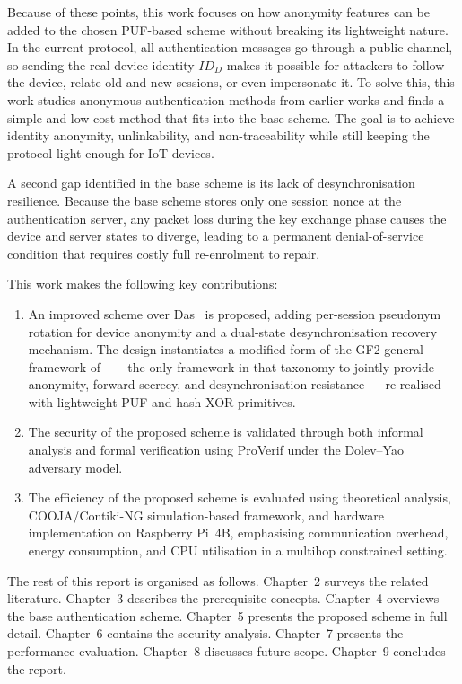 \documentclass[12pt,a4paper]{report}
\begin{document}
Because of these points, this work focuses on how anonymity features can be added to
the chosen PUF-based scheme without breaking its lightweight nature.
In the current protocol, all authentication messages go through a public channel, so
sending the real device identity $ID_D$ makes it possible for attackers to follow the
device, relate old and new sessions, or even impersonate it.
To solve this, this work studies anonymous authentication methods from earlier works
and finds a simple and low-cost method that fits into the base scheme.
The goal is to achieve identity anonymity, unlinkability, and non-traceability while
still keeping the protocol light enough for IoT devices.

A second gap identified in the base scheme is its lack of desynchronisation
resilience.
Because the base scheme stores only one session nonce at the authentication server,
any packet loss during the key exchange phase causes the device and server states to
diverge, leading to a permanent denial-of-service condition that requires costly
full re-enrolment to repair.

This work makes the following key contributions:
\begin{enumerate}
  \item An improved scheme over Das~\cite{das2026comsnets} is proposed, adding
    per-session pseudonym rotation for device anonymity and a dual-state
    desynchronisation recovery mechanism. The design instantiates a modified form
    of the GF2 general framework of~\cite{zhong2025survey} — the only framework in
    that taxonomy to jointly provide anonymity, forward secrecy, and
    desynchronisation resistance — re-realised with lightweight PUF and hash-XOR
    primitives.
  \item The security of the proposed scheme is validated through both informal
    analysis and formal verification using ProVerif under the Dolev--Yao adversary
    model.
  \item The efficiency of the proposed scheme is evaluated using theoretical analysis,
    COOJA/Contiki-NG simulation-based framework, and hardware implementation on
    Raspberry Pi~4B, emphasising communication overhead, energy consumption, and CPU
    utilisation in a multihop constrained setting.
\end{enumerate}

The rest of this report is organised as follows.
Chapter~2 surveys the related literature.
Chapter~3 describes the prerequisite concepts.
Chapter~4 overviews the base authentication scheme.
Chapter~5 presents the proposed scheme in full detail.
Chapter~6 contains the security analysis.
Chapter~7 presents the performance evaluation.
Chapter~8 discusses future scope.
Chapter~9 concludes the report.
\end{document}
